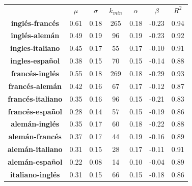 \begin{table}[h!]
	\centering
	\begin{tabular}{ccccccc}
		\textbf{}                & \textbf{$\mu$} & \textbf{$\sigma$} & \textbf{$k_{min}$} & \textbf{$\alpha$} & \textbf{$\beta$} & \textbf{$R^{2}$} \\
		\textbf{inglés-francés}  & 0.61           & 0.18                & 265                   & 0.18           & -0.23         & 0.94        \\
		\textbf{inglés-alemán}   & 0.49           & 0.19                & 96                    & 0.19           & -0.23         & 0.92        \\
		\textbf{ingles-italiano} & 0.45           & 0.17                & 55                    & 0.17           & -0.10         & 0.91        \\
		\textbf{ingles-español}  & 0.38           & 0.15                & 70                    & 0.15           & -0.14         & 0.88        \\
		\textbf{francés-inglés}  & 0.55           & 0.18                & 269                   & 0.18           & -0.29         & 0.93        \\
		\textbf{francés-alemán}   & 0.42           & 0.16                & 67                    & 0.17           & -0.12         & 0.87        \\
		\textbf{francés-italiano} & 0.35           & 0.16                & 96                    & 0.15           & -0.21         & 0.83        \\
		\textbf{francés-español}  & 0.28           & 0.14                & 57                    & 0.15           & -0.19         & 0.86        \\
		\textbf{alemán-inglés}  & 0.35             & 0.17                & 60                    & 0.18           & -0.22         & 0.88        \\
		\textbf{alemán-francés}   & 0.37           & 0.17                & 44                    & 0.19           & -0.16         & 0.89        \\
		\textbf{alemán-italiano} & 0.31            & 0.15                & 28                    & 0.17           & -0.11         & 0.91        \\
		\textbf{alemán-español}  & 0.22            & 0.08                & 14                    & 0.10           & -0.04         & 0.89        \\
		\textbf{italiano-inglés} & 0.31          & 0.15                & 66                   & 0.15           & -0.18        & 0.86        \\

\end{tabular}
\end{table}
